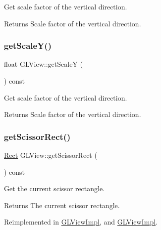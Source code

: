 Get scale factor of the vertical direction.

\begin{DoxyReturn}{Returns}
Scale factor of the vertical direction. 
\end{DoxyReturn}
\mbox{\label{classGLView_a3ee3994af139859a58568ccf3ba85aa6}} 
\subsubsection{\texorpdfstring{get\+Scale\+Y()}{getScaleY()}\hspace{0.1cm}{\footnotesize\ttfamily [2/2]}}
{\footnotesize\ttfamily float G\+L\+View\+::get\+ScaleY (\begin{DoxyParamCaption}{ }\end{DoxyParamCaption}) const}

Get scale factor of the vertical direction.

\begin{DoxyReturn}{Returns}
Scale factor of the vertical direction. 
\end{DoxyReturn}
\mbox{\label{classGLView_a83917d65d7b496a031bfa7a7516c319c}} 
\subsubsection{\texorpdfstring{get\+Scissor\+Rect()}{getScissorRect()}\hspace{0.1cm}{\footnotesize\ttfamily [1/2]}}
{\footnotesize\ttfamily \hyperlink{classRect}{Rect} G\+L\+View\+::get\+Scissor\+Rect (\begin{DoxyParamCaption}{ }\end{DoxyParamCaption}) const\hspace{0.3cm}{\ttfamily [virtual]}}

Get the current scissor rectangle.

\begin{DoxyReturn}{Returns}
The current scissor rectangle. 
\end{DoxyReturn}


Reimplemented in \hyperlink{classGLViewImpl_ab6bbfe46964ec4797344ecaa4fff3b1d}{G\+L\+View\+Impl}, and \hyperlink{classGLViewImpl_ada58319111ad3cca8b03ed92cfbf1bdf}{G\+L\+View\+Impl}.

